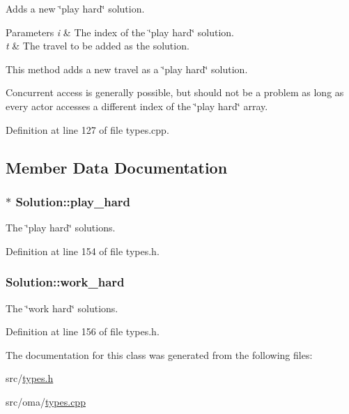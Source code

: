 Adds a new \char`\"{}play hard\char`\"{} solution. 


\begin{DoxyParams}{Parameters}
{\em i} & The index of the \char`\"{}play hard\char`\"{} solution. \\
\hline
{\em t} & The travel to be added as the solution.\\
\hline
\end{DoxyParams}
This method adds a new travel as a \char`\"{}play hard\char`\"{} solution.

Concurrent access is generally possible, but should not be a problem as long as every actor accesses a different index of the \char`\"{}play hard\char`\"{} array. 

Definition at line 127 of file types.\-cpp.



\subsection{Member Data Documentation}
\hypertarget{class_solution_a44f701ebb75bb81bdbce55e3b993a8ed}{
\subsubsection[{play\-\_\-hard}]{$\ast$ Solution\-::play\-\_\-hard}}\label{class_solution_a44f701ebb75bb81bdbce55e3b993a8ed}


The \char`\"{}play hard\char`\"{} solutions. 



Definition at line 154 of file types.\-h.

\hypertarget{class_solution_aa01e223ab1abc7d44183834d542ecc6b}{
\subsubsection[{work\-\_\-hard}]{ Solution\-::work\-\_\-hard}}\label{class_solution_aa01e223ab1abc7d44183834d542ecc6b}


The \char`\"{}work hard\char`\"{} solutions. 



Definition at line 156 of file types.\-h.



The documentation for this class was generated from the following files\-:\begin{DoxyCompactItemize}
\item 
src/\hyperlink{types_8h}{types.\-h}\item 
src/oma/\hyperlink{types_8cpp}{types.\-cpp}\end{DoxyCompactItemize}
